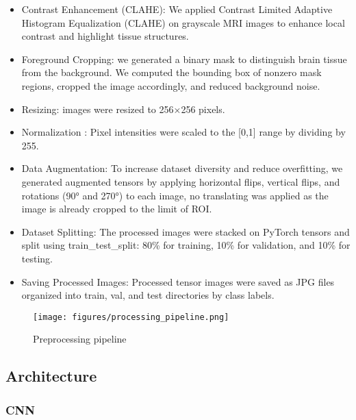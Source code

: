 \documentclass[twocolumn,superscriptaddress,aps]{revtex4-1}
\begin{document}
\begin{itemize}
    \item Contrast Enhancement (CLAHE): We applied Contrast Limited Adaptive Histogram Equalization (CLAHE) on grayscale MRI images to enhance local contrast and highlight tissue structures.
    \item Foreground Cropping: we generated a binary mask to distinguish brain tissue from the background. We computed the bounding box of nonzero mask regions, cropped the image accordingly, and reduced background noise.
    \item Resizing: images were resized to 256×256 pixels.
    \item Normalization : Pixel intensities were scaled to the [0,1] range by dividing by 255.
    \item Data Augmentation: To increase dataset diversity and reduce overfitting, we generated augmented tensors by applying horizontal flips, vertical flips, and rotations (90° and 270°) to each image, no translating was applied as the image is already cropped to the limit of ROI.
    \item Dataset Splitting: The processed images were stacked on PyTorch tensors and split using train\_test\_split: 80\% for training, 10\% for validation, and 10\% for testing.
    \item Saving Processed Images: Processed tensor images were saved as JPG files organized into train, val, and test directories by class labels.
\end{itemize}


\begin{figure}[htbp]
    \centering
    \texttt{[image: figures/processing\_pipeline.png]}
    \caption{Preprocessing pipeline}
    \label{Figure 2:preprocess pipeline}
\end{figure}




\subsection{Architecture}

\subsubsection{CNN}
\end{document}
